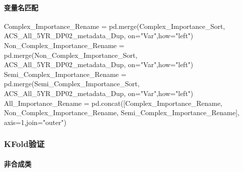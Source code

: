 \documentclass[
]{article}
\newenvironment{Shaded}{}{}
\newcommand{\DecValTok}[1]{\textcolor[rgb]{0.25,0.63,0.44}{#1}}
\newcommand{\NormalTok}[1]{#1}
\newcommand{\OperatorTok}[1]{\textcolor[rgb]{0.40,0.40,0.40}{#1}}
\newcommand{\StringTok}[1]{\textcolor[rgb]{0.25,0.44,0.63}{#1}}
\begin{document}
\hypertarget{header-n309}{%
\paragraph{变量名匹配}\label{header-n309}}

\begin{Shaded}
\begin{Highlighting}[]
\NormalTok{Complex\_Importance\_Rename }\OperatorTok{=}\NormalTok{ pd.merge(Complex\_Importance\_Sort,}
\NormalTok{                                      ACS\_All\_5YR\_DP02\_metadata\_Dup,}
\NormalTok{                                      on}\OperatorTok{=}\StringTok{"Var"}\NormalTok{,how}\OperatorTok{=}\StringTok{"left"}\NormalTok{)}
\NormalTok{Non\_Complex\_Importance\_Rename }\OperatorTok{=}\NormalTok{ pd.merge(Non\_Complex\_Importance\_Sort,}
\NormalTok{                                      ACS\_All\_5YR\_DP02\_metadata\_Dup,}
\NormalTok{                                      on}\OperatorTok{=}\StringTok{"Var"}\NormalTok{,how}\OperatorTok{=}\StringTok{"left"}\NormalTok{)}
\NormalTok{Semi\_Complex\_Importance\_Rename }\OperatorTok{=}\NormalTok{ pd.merge(Semi\_Complex\_Importance\_Sort,}
\NormalTok{                                      ACS\_All\_5YR\_DP02\_metadata\_Dup,}
\NormalTok{                                      on}\OperatorTok{=}\StringTok{"Var"}\NormalTok{,how}\OperatorTok{=}\StringTok{"left"}\NormalTok{)}
\NormalTok{All\_Importance\_Rename }\OperatorTok{=}\NormalTok{ pd.concat([Complex\_Importance\_Rename,}
\NormalTok{                                  Non\_Complex\_Importance\_Rename,}
\NormalTok{                                  Semi\_Complex\_Importance\_Rename],}
\NormalTok{                                axis}\OperatorTok{=}\DecValTok{1}\NormalTok{,join}\OperatorTok{=}\StringTok{"outer"}\NormalTok{)}
\end{Highlighting}
\end{Shaded}

\hypertarget{header-n312}{%
\subsubsection{KFold验证}\label{header-n312}}

\hypertarget{header-n313}{%
\paragraph{非合成类}\label{header-n313}}
\end{document}
